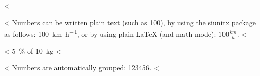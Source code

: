 <%

<%
Numbers can be written plain text (such as 100), by using the siunitx package as follows:
\SI{100}{\km\per\hour},
or by using plain \LaTeX{} (and math mode):
$100 \frac{\mathit{km}}{h}$.
<%

<%
\SI{5}{\percent} of \SI{10}{kg}
<%

<%
Numbers are automatically grouped: \num{123456}.
<%
